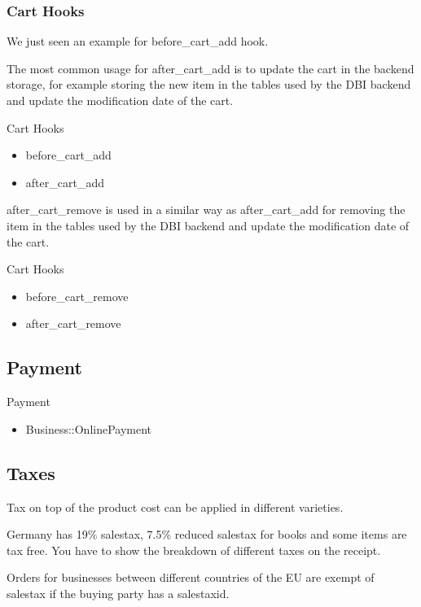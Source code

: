 \subsubsection{Cart Hooks}
We just seen an example for before_cart_add hook.

The most common usage for after_cart_add is to update the cart
in the backend storage, for example storing the new item in the tables 
used by the DBI backend and update the modification date of the cart.

\begin{frame}{Cart Hooks}
\begin{itemize}
\item before\_cart\_add
\item after\_cart\_add
\end{itemize}
\end{frame}

after_cart_remove is used in a similar way as after_cart_add 
for removing the item in the tables used by the DBI backend
and update the modification date of the cart.

\begin{frame}{Cart Hooks}
\begin{itemize}
\item before\_cart\_remove
\item after\_cart\_remove
\end{itemize}
\end{frame}

\subsection{Payment}
\begin{frame}{Payment}
\begin{itemize}
\item Business::OnlinePayment
\end{itemize}
\end{frame}

\subsection{Taxes}
Tax on top of the product cost can be applied in different varieties.

Germany has 19\% salestax, 7.5\% reduced salestax for books and some
items are tax free. You have to show the breakdown of different taxes
on the receipt.

Orders for businesses between different countries of the EU are exempt
of salestax if the buying party has a salestaxid.

